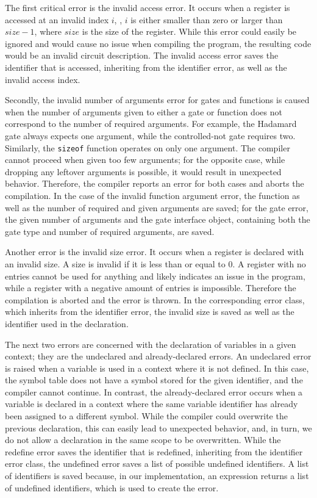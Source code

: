 The first critical error is the invalid access error. It occurs when a register is accessed at an invalid index $i$, \ie, $i$ is either smaller than zero or larger than $size - 1$, where $size$ is the size of the register. While this error could easily be ignored and would cause no issue when compiling the program, the resulting code would be an invalid circuit description. The invalid access error saves the identifier that is accessed, inheriting from the identifier error, as well as the invalid access index.

Secondly, the invalid number of arguments error for gates and functions is caused when the number of arguments given to either a gate or function does not correspond to the number of required arguments. For example, the Hadamard gate always expects one argument, while the controlled-not gate requires two. Similarly, the \texttt{sizeof} function operates on only one argument. The compiler cannot proceed when given too few arguments; for the opposite case, while dropping any leftover arguments is possible, it would result in unexpected behavior.
Therefore, the compiler reports an error for both cases and aborts the compilation. In the case of the invalid function argument error, the function as well as the number of required and given arguments are saved; for the gate error, the given number of arguments and the gate interface object, containing both the gate type and number of required arguments, are saved.

Another error is the invalid size error. It occurs when a register is declared with an invalid size. A size is invalid if it is less than or equal to $0$. A register with no entries cannot be used for anything and likely indicates an issue in the program, while a register with a negative amount of entries is impossible. Therefore the compilation is aborted and the error is thrown. In the corresponding error class, which inherits from the identifier error, the invalid size is saved as well as the identifier used in the declaration.

The next two errors are concerned with the declaration of variables in a given context; they are the undeclared and already-declared errors. An undeclared error is raised when a variable is used in a context where it is not defined. In this case, the symbol table does not have a symbol stored for the given identifier, and the compiler cannot continue. In contrast, the already-declared error occurs when a variable is declared in a context where the same variable identifier has already been assigned to a different symbol. While the compiler could overwrite the previous declaration, this can easily lead to unexpected behavior, and, in turn, we do not allow a declaration in the same scope to be overwritten. While the redefine error saves the identifier that is redefined, inheriting from the identifier error class, the undefined error saves a list of possible undefined identifiers. A list of identifiers is saved because, in our implementation, an expression returns a list of undefined identifiers, which is used to create the error.

